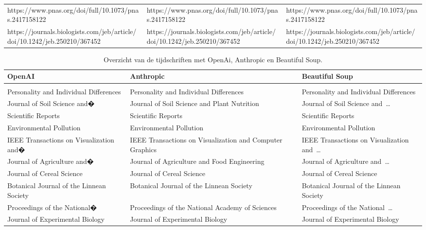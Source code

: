 \begin{table}[h!]
\begin{adjustbox}{width=1.2\textwidth,center}
\begin{tabularx}{\textwidth}{|X|X|X|}
        https://www.pnas.org/doi/full/10.1073/\allowbreak pnas.2417158122 & https://www.pnas.org/doi/full/10.1073/\allowbreak pnas.2417158122 & https://www.pnas.org/doi/full/10.1073/\allowbreak pnas.2417158122\\
        https://journals.biologists.com/jeb/\allowbreak article/doi/10.1242/jeb.250210/367452 & https://journals.biologists.com/jeb/\allowbreak article/doi/10.1242/jeb.250210/367452 & https://journals.biologists.com/jeb/\allowbreak article/doi/10.1242/jeb.250210/367452\\
        \hline
    \end{tabularx}
\end{adjustbox}
    \label{table:llmUrl}
\end{table}
\begin{table}[h!]
    \tiny
    \caption{Overzicht van de tijdschriften met OpenAi, Anthropic en Beautiful Soup.}
    \centering
    \begin{adjustbox}{width=1.2\textwidth,center}
    \begin{tabularx}{\textwidth}{|X|X|X|} 
        \hline
        \rowcolor{lightgray}
        OpenAI & Anthropic & Beautiful Soup \\ 
        \hline
        \rowcolor{lightgray}
        \multicolumn{3}{|X|}{Tijdschrift}\\ 
        \hline
        Personality and Individual Differences & Personality and Individual Differences & Personality and Individual Differences\\ 
        Journal of Soil Science and� & Journal of Soil Science and Plant Nutrition & Journal of Soil Science and …\\
        Scientific Reports & Scientific Reports & Scientific Reports\\
        Environmental Pollution & Environmental Pollution & Environmental Pollution\\
        IEEE Transactions on Visualization and� & IEEE Transactions on Visualization and Computer Graphics & IEEE Transactions on Visualization and …\\
        Journal of Agriculture and� & Journal of Agriculture and Food Engineering & Journal of Agriculture and …\\
        Journal of Cereal Science & Journal of Cereal Science & Journal of Cereal Science\\
        Botanical Journal of the Linnean Society & Botanical Journal of the Linnean Society & Botanical Journal of the Linnean Society\\
        Proceedings of the National� & Proceedings of the National Academy of Sciences & Proceedings of the National …\\
        Journal of Experimental Biology & Journal of Experimental Biology & Journal of Experimental Biology\\
        \hline
    \end{tabularx}
\end{adjustbox}
    \label{table:llmTijdschrift}
\end{table}
